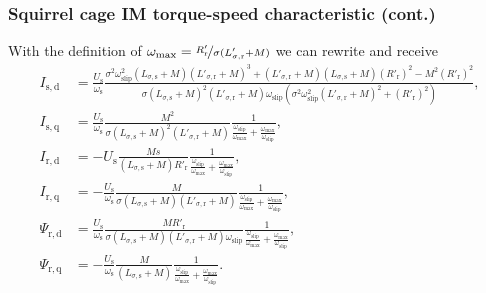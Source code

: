 \begin{frame}
	\frametitle{Squirrel cage IM torque-speed characteristic (cont.)} 
    With the definition of $\omega_\mathrm{max}=\nicefrac{R'_\mathrm{r}}{\sigma (L'_{\sigma,\mathrm{r}} +M)}$ we can rewrite and receive 
    \small
    \begin{align}
        I_\mathrm{s,d} &= \frac{U_\mathrm{s}}{\omega_\mathrm{s}}\frac{\sigma^2 \omega^2_\mathrm{slip} (L_{\sigma,\mathrm{s}} +M)(L'_{\sigma,\mathrm{r}} +M)^3 + (L'_{\sigma,\mathrm{r}} +M)(L_{\sigma,\mathrm{s}} +M)(R'_\mathrm{r})^2 - M^2(R'_\mathrm{r})^2}{\sigma (L_{\sigma,\mathrm{s}} +M)^2(L'_{\sigma,\mathrm{r}} +M) \omega_\mathrm{slip}(\sigma^2 \omega^2_\mathrm{slip}(L'_{\sigma,\mathrm{r}} +M)^2 + (R'_\mathrm{r})^2)},\\
        I_\mathrm{s,q} &= \frac{U_\mathrm{s}}{\omega_\mathrm{s}}\frac{M^2}{\sigma (L_{\sigma,\mathrm{s}} +M)^2(L'_{\sigma,\mathrm{r}} +M)}\frac{1}{\frac{\omega_\mathrm{slip}}{\omega_\mathrm{max}} + \frac{\omega_\mathrm{max}}{\omega_\mathrm{slip}}},\\
        I_\mathrm{r,d} &= -U_\mathrm{s}\frac{M s}{(L_{\sigma,\mathrm{s}} +M)R'_\mathrm{r}}\frac{1}{\frac{\omega_\mathrm{slip}}{\omega_\mathrm{max}} + \frac{\omega_\mathrm{max}}{\omega_\mathrm{slip}}},\\
        I_\mathrm{r,q} &= -\frac{U_\mathrm{s}}{\omega_\mathrm{s}} \frac{M}{\sigma (L_{\sigma,\mathrm{s}} +M)(L'_{\sigma,\mathrm{r}} +M)}\frac{1}{\frac{\omega_\mathrm{slip}}{\omega_\mathrm{max}} + \frac{\omega_\mathrm{max}}{\omega_\mathrm{slip}}},\\
        \Psi_\mathrm{r,d} &= \frac{U_\mathrm{s}}{\omega_\mathrm{s}}\frac{M R'_\mathrm{r}}{\sigma (L_{\sigma,\mathrm{s}} +M) (L'_{\sigma,\mathrm{r}} +M)\omega_\mathrm{slip}}\frac{1}{\frac{\omega_\mathrm{slip}}{\omega_\mathrm{max}} + \frac{\omega_\mathrm{max}}{\omega_\mathrm{slip}}},\\
        \Psi_\mathrm{r,q} &= -\frac{U_\mathrm{s}}{\omega_\mathrm{s}}\frac{M}{(L_{\sigma,\mathrm{s}} +M)}\frac{1}{\frac{\omega_\mathrm{slip}}{\omega_\mathrm{max}} + \frac{\omega_\mathrm{max}}{\omega_\mathrm{slip}}}.
    \end{align}
    \normalsize 
\end{frame}

